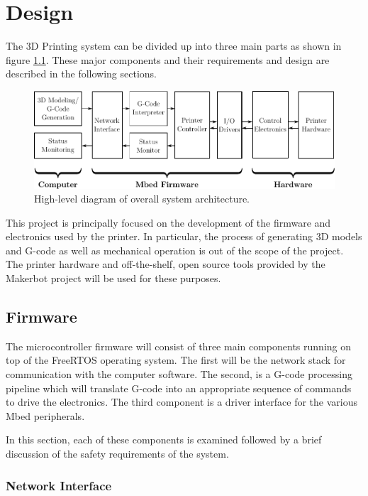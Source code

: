 \chapter{Design}
	
	\label{sec:design}
	
	The 3D Printing system can be divided up into three main parts as shown in
	figure \ref{fig:systemDiagramTop}. These major components and their
	requirements and design are described in the following sections.
	
	\begin{figure}
		\includegraphics[width=1\textwidth]{diagrams/systemDiagramTop.pdf}
		\caption{High-level diagram of overall system architecture.}
		\label{fig:systemDiagramTop}
	\end{figure}
	
	This project is principally focused on the development of the firmware and
	electronics used by the printer. In particular, the process of generating 3D
	models and G-code as well as mechanical operation is out of the scope of the
	project. The printer hardware and off-the-shelf, open source tools provided by
	the Makerbot project will be used for these purposes.
	
	\section{Firmware}
		
		The microcontroller firmware will consist of three main components running
		on top of the FreeRTOS operating system. The first will be the \uIP{}
		network stack for communication with the computer software. The second, is a
		G-code processing pipeline which will translate G-code into an appropriate
		sequence of commands to drive the electronics. The third component is a
		driver interface for the various Mbed peripherals.
		
		In this section, each of these components is examined followed by a brief
		discussion of the safety requirements of the system.
		
		\subsection{Network Interface}
			
